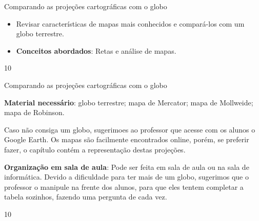 \begin{objectives}{Comparando as projeções cartográficas com o globo}
{
 \begin{itemize}
  \item Revisar características de mapas mais conhecidos e compará-los com um globo terrestre.
  \item \textbf{Conceitos abordados}: Retas e análise de mapas.
  \end{itemize} 
}{1}{0}
\end{objectives}
\begin{sugestions}{Comparando as projeções cartográficas com o globo}
{
  \textbf{Material necessário}: globo terrestre; mapa de Mercator; mapa de Mollweide; mapa de Robinson.

  Caso não consiga um globo, sugerimoes ao professor que acesse com os alunos o Google Earth. Os mapas são facilmente encontrados online, porém, se preferir fazer, o capítulo contém a representação destas projeções.

  \textbf{Organização em sala de aula}: Pode ser feita em sala de aula ou na sala de informática. Devido a dificuldade para ter mais de um globo, sugerimos que o professor o manipule na frente dos alunos, para que eles tentem completar a tabela sozinhos, fazendo uma pergunta de cada vez. 
}
{1}{0}
\end{sugestions}
